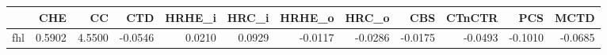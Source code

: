 \begin{tabular}{lrrrrrrrrrrr}
\toprule
 & CHE & CC & CTD & HRHE_i & HRC_i & HRHE_o & HRC_o & CBS & CTnCTR & PCS & MCTD \\
\midrule
fhl & 0.5902 & 4.5500 & -0.0546 & 0.0210 & 0.0929 & -0.0117 & -0.0286 & -0.0175 & -0.0493 & -0.1010 & -0.0685 \\
\bottomrule
\end{tabular}
